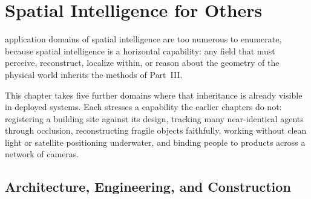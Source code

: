 \chapter{Spatial Intelligence for Others}
\label{sec:p4_s14}

 application domains of spatial intelligence are too numerous to enumerate, because spatial intelligence is a horizontal capability: any field that must perceive, reconstruct, localize within, or reason about the geometry of the physical world inherits the methods of Part~III. 

This chapter takes five further domains where that inheritance is already visible in deployed systems. Each stresses a capability the earlier chapters do not: registering a building site against its design, tracking many near-identical agents through occlusion, reconstructing fragile objects faithfully, working without clean light or satellite positioning underwater, and binding people to products across a network of cameras.

\section{Architecture, Engineering, and Construction}
\label{sec:part-4-section-14-architecture-engineering-and-construction}

